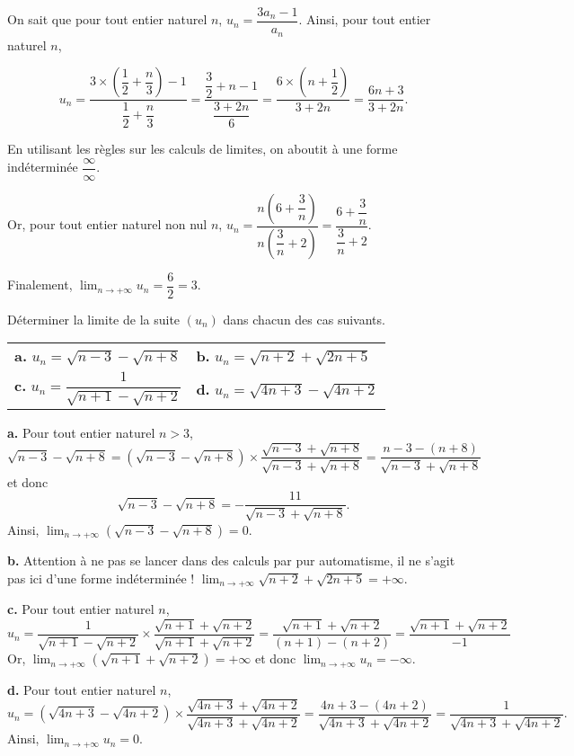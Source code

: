 \documentclass[11pt,fleqn]{book} %
\begin{document}
\begin{solution}
On sait que pour tout entier naturel $n$, $u_n=\dfrac{3a_n-1}{a_n}$. Ainsi, pour tout entier naturel $n$,

\[u_n =\dfrac{3 \times \left(\dfrac{1}{2}+\dfrac{n}{3}\right)-1}{\dfrac{1}{2}+\dfrac{n}{3}} =\dfrac{\dfrac{3}{2}+n-1}{\dfrac{3+2n}{6}}=\dfrac{6\times\left(n+\dfrac{1}{2}\right)}{3+2n}=\dfrac{6n+3}{3+2n}.\]

En utilisant les règles sur les calculs de limites, on aboutit à une forme indéterminée $\dfrac{\infty}{\infty}  $. 

Or, pour tout entier naturel non nul $n$, $u_n=\dfrac{n\left(6+\dfrac{3}{n}\right)}{n\left(\dfrac{3}{n}+2\right)}=\dfrac{6+\dfrac{3}{n}}{\dfrac{3}{n}+2}$.

Finalement, $\displaystyle \lim_{n\to+\infty}u_n=\dfrac{6}{2}=3$.\end{solution}



\begin{exercise} Déterminer la limite de la suite $(u_n)$ dans chacun des cas suivants.
\begin{center}
\begin{tabularx}{\linewidth}{XX}
\textbf{a.} $ u_n = \sqrt{n-3}-\sqrt{n+8}$ & \textbf{b.} $ u_n=\sqrt{n+2}+\sqrt{2n+5}$ \\
\textbf{c.} $u_n=\dfrac{1}{\sqrt{n+1}-\sqrt{n+2}}$ & \textbf{d.} $u_n=\sqrt{4n+3}-\sqrt{4n+2}$
\end{tabularx}
\end{center}\end{exercise}
\begin{solution}\textbf{a.} Pour tout entier naturel $n>3$, \[\sqrt{n-3}-\sqrt{n+8}=(\sqrt{n-3}-\sqrt{n+8}) \times \dfrac{\sqrt{n-3}+\sqrt{n+8}}{\sqrt{n-3}+\sqrt{n+8}}=\dfrac{n-3-(n+8)}{\sqrt{n-3}+\sqrt{n+8}}\]
et donc
\[\sqrt{n-3}-\sqrt{n+8}=-\dfrac{11}{\sqrt{n-3}+\sqrt{n+8}}.\]
 Ainsi,  $\displaystyle \lim_{n \to +\infty} (\sqrt{n-3}-\sqrt{n+8}) = 0$.\
 
 \textbf{b.} Attention à ne pas se lancer dans des calculs par pur automatisme, il ne s'agit pas ici d'une forme indéterminée ! $\displaystyle \lim_{n \to +\infty} \sqrt{n+2}+\sqrt{2n+5} = +\infty$.
 
 \textbf{c.} Pour tout entier naturel $n$,
\[u_n=\dfrac{1}{\sqrt{n+1}-\sqrt{n+2}} \times \dfrac{\sqrt{n+1}+\sqrt{n+2}}{\sqrt{n+1}+\sqrt{n+2}}=\dfrac{\sqrt{n+1}+\sqrt{n+2}}{(n+1)-(n+2)}=\dfrac{\sqrt{n+1}+\sqrt{n+2}}{-1}\]
Or, $\displaystyle \lim_{n\to+\infty}(\sqrt{n+1}+\sqrt{n+2})=+\infty$ et donc $\displaystyle\lim_{n\to+\infty}u_n=-\infty$.\

\textbf{d.} Pour tout entier naturel $n$,
\[u_n = (\sqrt{4n+3}-\sqrt{4n+2}) \times \dfrac{\sqrt{4n+3}+\sqrt{4n+2}}{\sqrt{4n+3}+\sqrt{4n+2}}= \dfrac{4n+3-(4n+2)}{\sqrt{4n+3}+\sqrt{4n+2}}=\dfrac{1}{\sqrt{4n+3}+\sqrt{4n+2}}.\]
Ainsi, $\displaystyle\lim_{n \to+\infty}u_n=0$.\end{solution}
\end{document}
